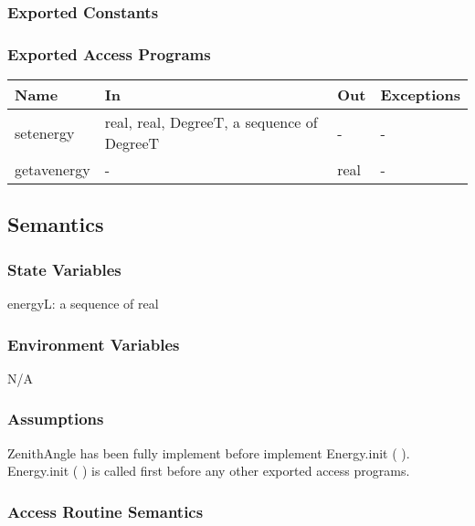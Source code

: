 \documentclass[12pt, titlepage]{article}
\begin{document}
\subsubsection{Exported Constants}


\subsubsection{Exported Access Programs}

\begin{center}
\begin{tabular}{p{2cm} p{5cm} p{4cm} p{1cm}}
\hline
\textbf{Name} & \textbf{In} & \textbf{Out} & \textbf{Exceptions} \\
\hline 
setenergy & real, real, DegreeT, a sequence of DegreeT & - & - \\
getavenergy & - & real & - \\

\hline
\end{tabular}
\end{center}


\subsection{Semantics}

\subsubsection{State Variables}

energyL: a sequence of real\\

\subsubsection{Environment Variables}

N/A

\subsubsection{Assumptions}
ZenithAngle has been fully implement before implement Energy.init ( ).\\
Energy.init ( ) is called first before any other exported access programs.\\


\subsubsection{ Access Routine Semantics}
\end{document}
